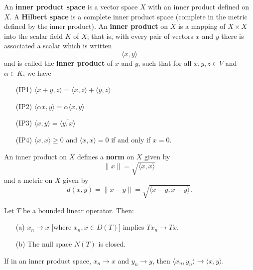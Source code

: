 \begin{definition}
   An \textbf{inner product space} is a vector space \( X  \) with an inner product defined on \( X  \). A \textbf{Hilbert space} is a complete inner product space (complete in the metric defined by the inner product). An \textbf{inner product} on \( X  \) is a mapping of \( X \times X  \) into the scalar field \( K  \) of \( X  \); that is, with every pair of vectors \( x  \) and \( y \) there is associated a scalar which is written  
   \[  \langle x , y \rangle \] 
   and is called the \textbf{inner product} of \( x  \) and \( y \), such that for all \( x,y,z \in V  \) and \( \alpha \in K  \), we have
   \begin{enumerate}
       \item[(IP1)] \( \langle x + y  ,  z  \rangle = \langle x  ,  z  \rangle + \langle y  ,  z  \rangle \)
        \item[(IP2)] \( \langle \alpha x  ,  y  \rangle = \alpha \langle x , y \rangle \)
        \item[(IP3)] \( \langle x , y \rangle = \overline{\langle y , x \rangle} \)
        \item[(IP4)] \( \langle x  ,  x  \rangle \geq 0  \) and \( \langle x  ,  x  \rangle = 0   \) if and only if \( x = 0  \). 
   \end{enumerate}
   An inner product on \( X  \) defines a \textbf{norm} on \( X  \) given by 
   \[  \|x \| = \sqrt{ \langle x  , x  \rangle }  \]
   and a metric on \( X  \) given by
   \[  d(x,y) = \|x - y \| = \sqrt{  \langle  x - y  ,  x - y  \rangle }.  \]
\end{definition}


\begin{corollary}\label{2.7-10}
    Let \( T  \) be a bounded linear operator. Then:
    \begin{enumerate}
        \item[(a)] \( {x}_{n} \to x  \) [where \( {x}_{n}, x \in D(T) \)] implies \( T {x}_{n} \to T x  \). 
        \item[(b)] The null space \( N(T) \) is closed.
    \end{enumerate}
\end{corollary}




\begin{lemma}\label{3.2-2}
   If in an inner product space, \( {x}_{n} \to x  \) and \( {y}_{n} \to y  \), then \( \langle {x}_{n}  ,  {y}_{n} \rangle \to \langle x , y \rangle \). 
\end{lemma}

